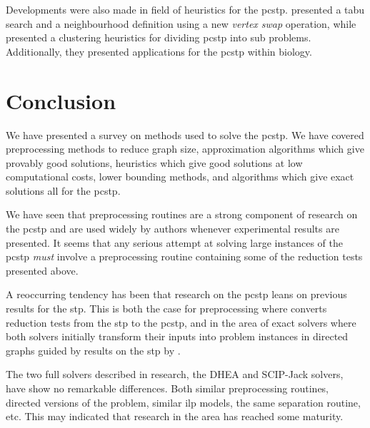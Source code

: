   Developments were also made in field of heuristics for the \gls{pcstp}. \citet{fu2014knowledge} presented a tabu search and a neighbourhood definition
  using a new \textit{vertex swap} operation, while
  \citet{akhmedov2016divide} presented a clustering heuristics for dividing \gls{pcstp} into sub problems.
  Additionally, they presented
  applications for the \gls{pcstp} within biology.

\clearpage


\clearpage








\section{Conclusion}
We have presented a survey on methods used to solve the \acrlong{pcstp}. We have covered
preprocessing methods to reduce graph size, approximation algorithms which give provably
good solutions, heuristics which give good solutions at low computational costs, lower
bounding methods, and algorithms which give exact solutions all for the \gls{pcstp}.

We have seen that preprocessing routines are a strong component of
research on the \gls{pcstp} and are
used widely by authors whenever experimental results are presented. It seems that
any serious attempt at solving large instances of the \gls{pcstp} \textit{must} involve a
preprocessing routine containing some of the reduction tests presented above.

A reoccurring tendency has been that research on the \gls{pcstp} leans on
previous results for the \gls{stp}. This is both the case for preprocessing
where \citet{uchoa2006reduction} converts reduction tests from the \gls{stp}
to the \gls{pcstp}, and in the area of exact solvers where both solvers
initially transform their inputs into problem instances in directed graphs
guided by results on the \gls{stp} by \citet{chopra1994steiner}.

The two full solvers described in research, the DHEA and SCIP-Jack solvers, have show no
remarkable differences. Both similar preprocessing routines, directed versions of the problem,
similar \gls{ilp} models, the same separation routine, etc. This may indicated that research
in the area has reached some maturity.



